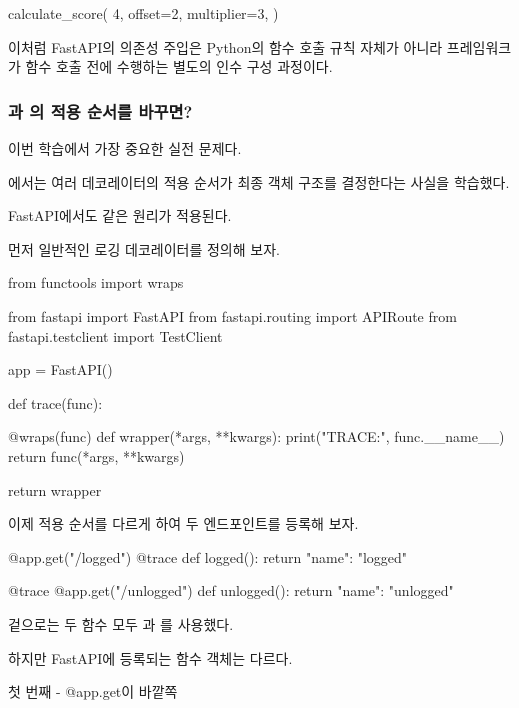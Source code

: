 \begin{dhkcode}
calculate_score(
    4,
    offset=2,
    multiplier=3,
)
\end{dhkcode}

이처럼 FastAPI의 의존성 주입은 Python의 함수 호출 규칙 자체가 아니라 프레임워크가 함수 호출 전에 수행하는 별도의 인수 구성 과정이다.

\subsubsection{과 의 적용 순서를 바꾸면?}

이번 학습에서 가장 중요한 실전 문제다.

에서는 여러 데코레이터의 적용 순서가 최종 객체 구조를 결정한다는 사실을 학습했다.

FastAPI에서도 같은 원리가 적용된다.

먼저 일반적인 로깅 데코레이터를 정의해 보자.

\begin{dhkcode}
from functools import wraps

from fastapi import FastAPI
from fastapi.routing import APIRoute
from fastapi.testclient import TestClient


app = FastAPI()


def trace(func):

    @wraps(func)
    def wrapper(*args, **kwargs):
        print("TRACE:", func.__name__)
        return func(*args, **kwargs)

    return wrapper
\end{dhkcode}

이제 적용 순서를 다르게 하여 두 엔드포인트를 등록해 보자.

\begin{dhkcode}
@app.get("/logged")
@trace
def logged():
    return {"name": "logged"}


@trace
@app.get("/unlogged")
def unlogged():
    return {"name": "unlogged"}
\end{dhkcode}

겉으로는 두 함수 모두 과 를 사용했다.

하지만 FastAPI에 등록되는 함수 객체는 다르다.

\begin{dhknote}
\begin{dhksmry}[centered]
첫 번째 - @app.get이 바깥쪽
\end{dhksmry}
\end{dhknote}

